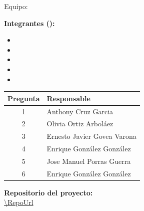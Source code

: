 \begin{titlepage}
  \centering
  \vspace*{1.5cm}
  {\Large\Asignatura\par}
  \vspace{1.5cm}
  {\LARGE\bfseries \TituloActividad\par}
  \vspace{2cm}
  {\Large Equipo: \NombreEquipo\par}
  \vspace{1.5cm}
  \begin{flushleft}
    \textbf{Integrantes (\GrupoAsignatura):}
    \begin{itemize}
      \item \IntegranteUno
      \item \IntegranteDos
      \item \IntegranteTres
      \item \IntegranteCuatro
      \item \IntegranteCinco
    \end{itemize}
  \end{flushleft}

  \vspace{1.25em}
  \begin{center}
    \begin{tabular}{@{}cl@{}}
      \toprule
      \textbf{Pregunta} & \textbf{Responsable} \\
      \midrule
      1 & Anthony Cruz Garcia \\
      2 & Olivia Ortiz Arboláez \\
      3 & Ernesto Javier Govea Varona \\
      4 & Enrique González González  \\
      5 & Jose Manuel Porras Guerra \\
      6 & Enrique González González \\
      \bottomrule
    \end{tabular}
  \end{center}
  \vspace{1.25em}

  \textbf{Repositorio del proyecto:}\\
  \url{\RepoUrl}
\end{titlepage}
